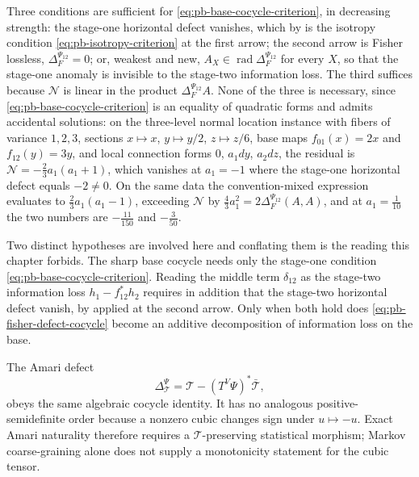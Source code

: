 Three conditions are sufficient for
\eqref{eq:pb-base-cocycle-criterion}, in decreasing strength: the stage-one
horizontal defect vanishes, which by  is the
isotropy condition \eqref{eq:pb-isotropy-criterion} at the first arrow; the
second arrow is Fisher lossless, $\Delta_F^{\Psi_{12}}=0$; or, weakest and new,
$A_X\in\operatorname{rad}\Delta_F^{\Psi_{12}}$ for every $X$, so that the
stage-one anomaly is invisible to the stage-two information loss.  The third
suffices because $\mathcal N$ is linear in the product
$\Delta_F^{\Psi_{12}}A$.  None of the three is necessary, since
\eqref{eq:pb-base-cocycle-criterion} is an equality of quadratic forms and admits
accidental solutions: on the three-level normal location instance with fibers
of variance $1,2,3$, sections $x\mapsto x$, $y\mapsto y/2$, $z\mapsto z/6$,
base maps $f_{01}(x)=2x$ and $f_{12}(y)=3y$, and local connection forms $0$,
$a_1dy$, $a_2dz$, the residual is
$\mathcal N=-\tfrac23a_1(a_1+1)$, which vanishes at $a_1=-1$ where the
stage-one horizontal defect equals $-2\ne0$.  On the same data the
convention-mixed expression evaluates to $\tfrac23a_1(a_1-1)$, exceeding
$\mathcal N$ by $\tfrac43a_1^2=2\Delta_F^{\Psi_{12}}(A,A)$, and at
$a_1=\tfrac1{10}$ the two numbers are $-\tfrac{11}{150}$ and $-\tfrac3{50}$.

Two distinct hypotheses are involved here and conflating them is the reading
this chapter forbids.  The sharp base cocycle needs only the stage-one
condition \eqref{eq:pb-base-cocycle-criterion}.  Reading the middle term
$\delta_{12}$ as the stage-two information loss $h_1-f_{12}^*h_2$ requires in
addition that the stage-two horizontal defect vanish, by
 applied at the second arrow.  Only when
both hold does \eqref{eq:pb-fisher-defect-cocycle} become an additive
decomposition of information loss on the base.  

The Amari defect
\begin{equation}
\Delta_{\mathcal T}^\Psi
=\mathcal T-(T^V\Psi)^*\bar{\mathcal T},
\label{eq:pb-amari-defect}
\end{equation}
obeys the same algebraic cocycle identity.  It has no analogous
positive-semidefinite order because a nonzero cubic changes sign under
$u\mapsto-u$.  Exact Amari naturality therefore requires a
$\mathcal T$-preserving statistical morphism; Markov coarse-graining alone
does not supply a monotonicity statement for the cubic tensor.

